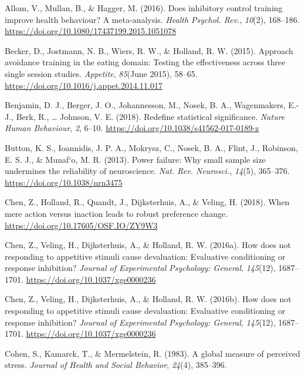 \documentclass[man,floatsintext]{apa6}
\begin{document}
\hypertarget{ref-allom_does_2016}{}
Allom, V., Mullan, B., \& Hagger, M. (2016). Does inhibitory control
training improve health behaviour? A meta-analysis. \emph{Health
Psychol. Rev.}, \emph{10}(2), 168--186.
\url{https://doi.org/10.1080/17437199.2015.1051078}

\hypertarget{ref-becker_approach_2015-1}{}
Becker, D., Jostmann, N. B., Wiers, R. W., \& Holland, R. W. (2015).
Approach avoidance training in the eating domain: Testing the
effectiveness across three single session studies. \emph{Appetite},
\emph{85}(June 2015), 58--65.
\url{https://doi.org/10.1016/j.appet.2014.11.017}

\hypertarget{ref-benjamin_redefine_2017}{}
Benjamin, D. J., Berger, J. O., Johannesson, M., Nosek, B. A.,
Wagenmakers, E.-J., Berk, R., \ldots{} Johnson, V. E. (2018). Redefine
statistical significance. \emph{Nature Human Behaviour}, \emph{2},
6--10. \url{https://doi.org/10.1038/s41562-017-0189-z}

\hypertarget{ref-button_power_2013}{}
Button, K. S., Ioannidis, J. P. A., Mokrysz, C., Nosek, B. A., Flint,
J., Robinson, E. S. J., \& Munaf\a`o, M. R. (2013). Power failure: Why
small sample size undermines the reliability of neuroscience. \emph{Nat.
Rev. Neurosci.}, \emph{14}(5), 365--376.
\url{https://doi.org/10.1038/nrn3475}

\hypertarget{ref-chen_when_2018}{}
Chen, Z., Holland, R., Quandt, J., Dijksterhuis, A., \& Veling, H.
(2018). When mere action versus inaction leads to robust preference
change. \url{https://doi.org/10.17605/OSF.IO/ZY9W3}

\hypertarget{ref-chen_how_2016-1}{}
Chen, Z., Veling, H., Dijksterhuis, A., \& Holland, R. W. (2016a). How
does not responding to appetitive stimuli cause devaluation: Evaluative
conditioning or response inhibition? \emph{Journal of Experimental
Psychology: General}, \emph{145}(12), 1687--1701.
\url{https://doi.org/10.1037/xge0000236}

\hypertarget{ref-chen_how_2016}{}
Chen, Z., Veling, H., Dijksterhuis, A., \& Holland, R. W. (2016b). How
does not responding to appetitive stimuli cause devaluation: Evaluative
conditioning or response inhibition? \emph{Journal of Experimental
Psychology: General}, \emph{145}(12), 1687--1701.
\url{https://doi.org/10.1037/xge0000236}

\hypertarget{ref-cohenGlobalMeasurePerceived1983}{}
Cohen, S., Kamarck, T., \& Mermelstein, R. (1983). A global measure of
perceived stress. \emph{Journal of Health and Social Behavior},
\emph{24}(4), 385--396.
\end{document}
